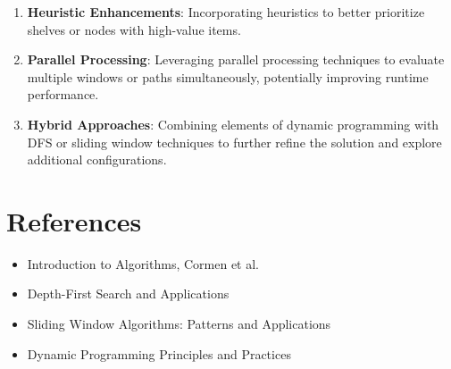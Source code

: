 \documentclass{article}
\begin{document}
\begin{enumerate}
    \item \textbf{Heuristic Enhancements}: Incorporating heuristics to better prioritize shelves or nodes with high-value items.
    \item \textbf{Parallel Processing}: Leveraging parallel processing techniques to evaluate multiple windows or paths simultaneously, potentially improving runtime performance.
    \item \textbf{Hybrid Approaches}: Combining elements of dynamic programming with DFS or sliding window techniques to further refine the solution and explore additional configurations.
\end{enumerate}

\section{References}
\begin{itemize}
    \item Introduction to Algorithms, Cormen et al.
    \item Depth-First Search and Applications
    \item Sliding Window Algorithms: Patterns and Applications
    \item Dynamic Programming Principles and Practices
\end{itemize}
\end{document}
